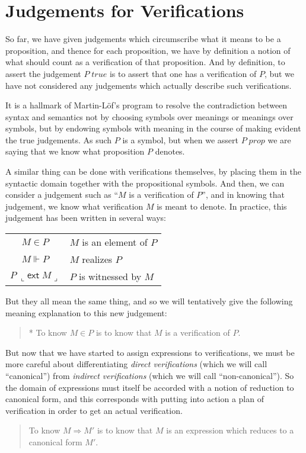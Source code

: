 \documentclass{amsart}
\theoremstyle{definition}
\theoremstyle{remark}
\numberwithin{equation}{section}
\newcommand\isprop[1]{\ensuremath{#1\;\mathit{prop}}}
\newcommand\istrue[1]{\ensuremath{#1\;\mathit{true}}}
\newcommand\ver[2]{\ensuremath{#1\in#2}}
\newcommand\reduce[2]{\ensuremath{#1\Rightarrow#2}}
\begin{document}
\section{Judgements for Verifications}

So far, we have given judgements which circumscribe what it means to be a
proposition, and thence for each proposition, we have by definition a notion of
what should count as a verification of that proposition. And by definition, to
assert the judgement \istrue{P} is to assert that one has a verification of $P$,
but we have not considered any judgements which actually describe such
verifications.

It is a hallmark of Martin-L\"of's program to resolve the contradiction between
syntax and semantics not by choosing symbols over meanings or meanings over
symbols, but by endowing symbols with meaning in the course of making evident
the true judgements. As such $P$ is a symbol, but when we assert \isprop{P} we
are saying that we know what proposition $P$ denotes.

A similar thing can be done with verifications themselves, by placing them in
the syntactic domain together with the propositional symbols. And then, we can
consider a judgement such as ``$M$ is a verification of $P$'', and in knowing
that judgement, we know what verification $M$ is meant to denote. In practice,
this judgement has been written in several ways:\\\medskip
\begin{tabular}{c|l}
  $M\in P$ & $M$ is an element of $P$\\
  $M\Vdash P$ & $M$ realizes $P$\\
  $P\ \llcorner\mathsf{ext}\; M\lrcorner$ & $P$ is witnessed by $M$
\end{tabular}

But they all mean the same thing, and so we will tentatively give the following
meaning explanation to this new judgement:
\begin{quote}
  * To know $\ver{M}{P}$ is to know that $M$ is a verification of $P$.
\end{quote}

But now that we have started to assign expressions to verifications, we must be
more careful about differentiating \emph{direct verifications} (which we will
call ``canonical'') from \emph{indirect verifications} (which we will call
``non-canonical''). So the domain of expressions must itself be accorded with a
notion of reduction to canonical form, and this corresponds with putting into
action a plan of verification in order to get an actual verification.
\begin{quote}
  To know \reduce{M}{M'} is to know that $M$ is an expression which reduces to
  a canonical form $M'$.
\end{quote}
\end{document}
